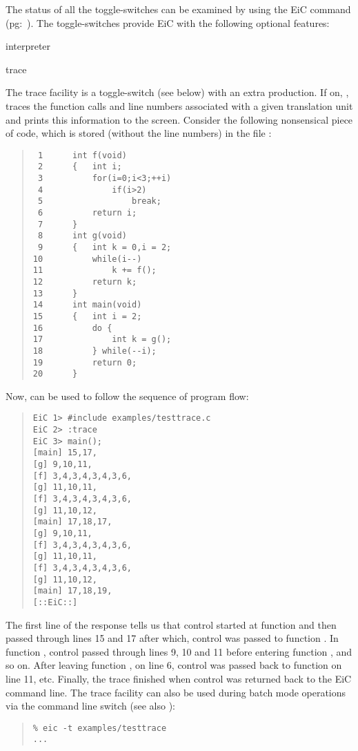 The status of all the toggle-switches can be examined by using
the EiC command  (pg:~\pageref{item:status}). 
The toggle-switches  provide EiC with the following
optional features:

\small
\begin{Ventry} {interpreter} 

\item[trace]
\label{item:trace} 

The trace facility is a toggle-switch (see below) with an extra
production.  If on, , traces the function calls and line numbers
associated with a given translation unit and prints this information
to the screen. Consider the following nonsensical piece of code, which
is stored (without the line numbers) in the file
:

\begin{quote}
\begin{verbatim}
 1      int f(void)
 2      {   int i;
 3          for(i=0;i<3;++i)
 4              if(i>2)
 5                  break;
 6          return i;
 7      }
 8      int g(void)
 9      {   int k = 0,i = 2;
10          while(i--)
11              k += f();
12          return k;
13      }
14      int main(void)
15      {   int i = 2;
16          do {
17              int k = g();
18          } while(--i);
19          return 0;
20      }
\end{verbatim}
\end{quote}

Now,  can be used to follow the sequence of program flow:
\begin{quote}
\begin{verbatim}
EiC 1> #include examples/testtrace.c
EiC 2> :trace
EiC 3> main();
[main] 15,17,
[g] 9,10,11,
[f] 3,4,3,4,3,4,3,6,
[g] 11,10,11,
[f] 3,4,3,4,3,4,3,6,
[g] 11,10,12,
[main] 17,18,17,
[g] 9,10,11,
[f] 3,4,3,4,3,4,3,6,
[g] 11,10,11,
[f] 3,4,3,4,3,4,3,6,
[g] 11,10,12,
[main] 17,18,19,
[::EiC::] 
\end{verbatim}
\end{quote}

The first line of the response tells us that control started at
function  and then passed through lines 15 and 17 after
which, control was passed to function . In function ,
control passed through lines 9, 10 and 11 before entering function
, and so on. After leaving function , on line 6, control was
passed back to function  on line 11, etc. Finally, the trace
finished when control was returned back to the EiC command line. The
trace facility can also be used during batch mode operations via the command line switch  (see also
):
\begin{quote}
\begin{verbatim}
% eic -t examples/testtrace
...
\end{verbatim}
\end{quote}


\end{Ventry}

